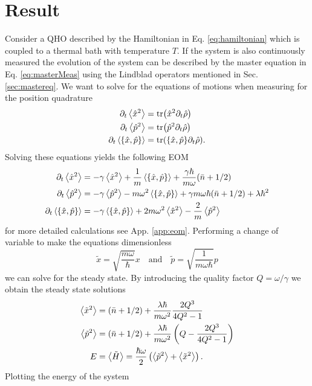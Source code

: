 \section{Result}
Consider a QHO described by the Hamiltonian in Eq. \eqref{eq:hamiltonian} which is coupled to a thermal bath with temperature $T$. If the system is also continuously measured the evolution of the system can be described by the master equation in Eq. \eqref{eq:masterMeas} using the Lindblad operators mentioned in Sec. \ref{sec:mastereq}. We want to solve for the equations of motions when measuring for the position quadrature
\begin{align}
    \dt\expval{\xop^2} &= \tr(\xop^2 \dt \dmatrix)\label{eq:x2} \\
    \dt\expval{\pop^2} &= \tr(\pop^2 \dt \dmatrix)\label{eq:p2}\\
    \dt\expval{\acomm{\xop}{\pop}} &= \tr(\acomm{\xop}{\pop} \dt \dmatrix). \label{eq:xp}
\end{align}
Solving these equations yields the following EOM
\begin{align}
    \dt\expval{\xop^2} &= - \gamma \expval{\xop^2} + \frac{1}{m}\expval{\acomm{\xop}{\pop}} + \frac{\gamma \hbar}{m\omega}(\nbar + 1/2)\\
    \dt\expval{\pop^2} &= -\gamma \expval{\pop^2} - m\omega^2 \expval{\acomm{\xop}{\pop}} + \gamma m \omega\hbar (\nbar + 1/2) + \lambda \hbar^2\\
    \dt\expval{\acomm{\xop}{\pop}} &= -\gamma \expval{\acomm{\xop}{\pop}} + 2 m \omega^2 \expval{\xop^2} - \frac{2}{m} \expval{\pop^2}
\end{align}
for more detailed calculations see App. \ref{app:eom}. Performing a change of variable to make the equations dimensionless
\begin{equation}
    \tilde{x} = \sqrt{\frac{m\omega}{\hbar}} x \quad \text{and} \quad \tilde{p} = \sqrt{\frac{1}{m \omega \hbar}} p 
\end{equation}
we can solve for the steady state. By introducing the quality factor $Q = \omega / \gamma$ we obtain the steady state solutions
\begin{align}
    \expval{\tilde{x}^2} &= (\bar{n} + 1/2) + \frac{\lambda \hbar}{m \omega^2} \frac{2 Q^3}{4Q^2 - 1}\\
    \expval{\tilde{p}^2} &= (\bar{n} + 1/2) + \frac{\lambda \hbar}{m \omega^2} \left( Q - \frac{2Q^3}{4Q^2 - 1} \right)\\
    E &= \expval{\tilde{H}} = \frac{\hbar \omega}{2} \left( \expval{\tilde{p}^2} + \expval{\tilde{x}^2} \right).
\end{align}
Plotting the energy of the system 

